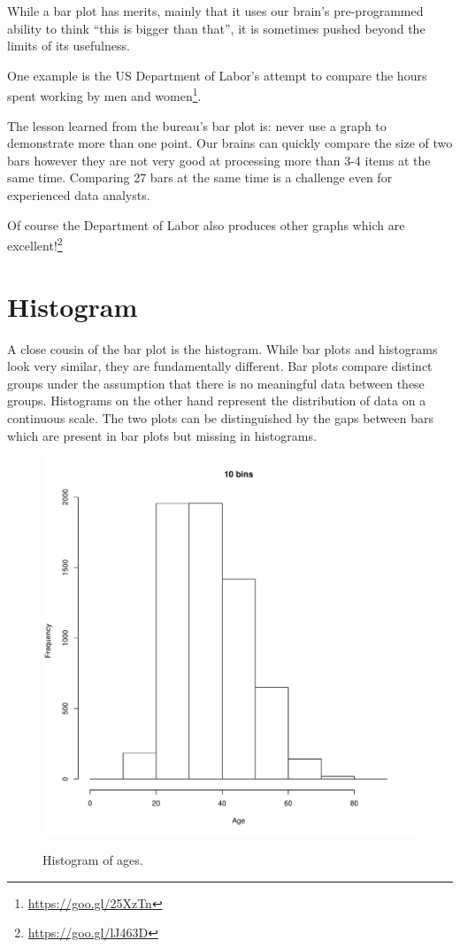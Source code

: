\documentclass{tufte-book} %
\begin{document}
While a bar plot has merits, mainly that it uses our brain's pre-programmed ability to think ``this is bigger than that'', it is sometimes pushed beyond the limits of its usefulness. 

One example is the US Department of Labor's attempt to compare the hours spent working by men and women\footnote{\url{https://goo.gl/25XzTn}}. 
\begin{tcolorbox}
The lesson learned from the bureau's bar plot is: never use a graph to demonstrate more than one point. Our brains can quickly compare the size of two bars however they are not very good at processing more than 3-4 items at the same time. Comparing 27 bars at the same time is a challenge even for experienced data analysts. 
\end{tcolorbox}
Of course the Department of Labor also produces other graphs which are excellent!\footnote{\url{https://goo.gl/lJ463D}}

\section{Histogram}
A close cousin of the bar plot is the histogram. While bar plots and histograms look very similar, they are fundamentally different. Bar plots compare distinct groups under the assumption that there is no meaningful data between these groups. Histograms on the other hand represent the distribution of data on a continuous scale. The two plots can be distinguished by the gaps between bars which are present in bar plots but missing in histograms.

\begin{figure}
	\centering
	\includegraphics{graphics/histogram-ages-10bins}
	\label{img:histogram-ages-10bins}
	\caption{Histogram of ages.}
\end{figure}
\end{document}
